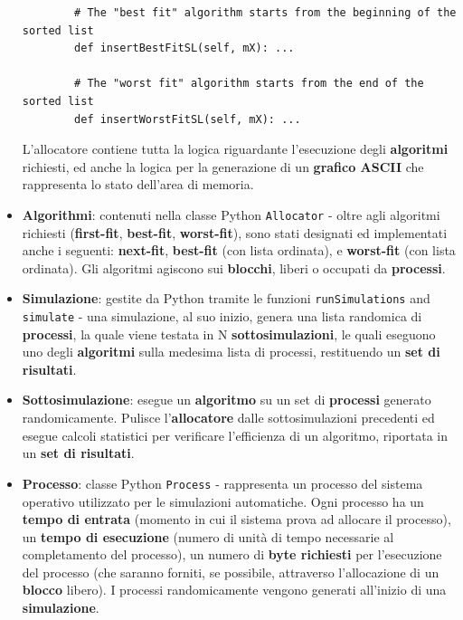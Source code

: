 \documentclass[12pt]{report}
\renewcommand\emph{\textbf}
\begin{document}
\begin{itemize}
\begin{verbatim}
        # The "best fit" algorithm starts from the beginning of the sorted list
        def insertBestFitSL(self, mX): ...

        # The "worst fit" algorithm starts from the end of the sorted list
        def insertWorstFitSL(self, mX): ...
            \end{verbatim}


            L'allocatore contiene tutta la logica riguardante l'esecuzione degli \emph{algoritmi} richiesti, ed anche la logica per la generazione di un \emph{grafico ASCII} che rappresenta lo stato dell'area di memoria.
            \item \emph{Algorithmi}: contenuti nella classe Python \texttt{Allocator} - oltre agli algoritmi richiesti (\emph{first-fit}, \emph{best-fit}, \emph{worst-fit}), sono stati designati ed implementati anche i seguenti: \emph{next-fit}, \emph{best-fit} (con lista ordinata), e \emph{worst-fit} (con lista ordinata).
            Gli algoritmi agiscono sui \emph{blocchi}, liberi o occupati da \emph{processi}.


            \item \emph{Simulazione}: gestite da Python tramite le funzioni \texttt{runSimulations} and \texttt{simulate} - una simulazione, al suo inizio, genera una lista randomica di \emph{processi}, la quale viene testata in N \emph{sottosimulazioni}, le quali eseguono uno degli \emph{algoritmi} sulla medesima lista di processi, restituendo un \emph{set di risultati}.



            \item \emph{Sottosimulazione}: esegue un \emph{algoritmo} su un set di \emph{processi} generato randomicamente. Pulisce l'\emph{allocatore} dalle sottosimulazioni precedenti ed esegue calcoli statistici per verificare l'efficienza di un algoritmo, riportata in un \emph{set di risultati}.
            \item \emph{Processo}: classe Python \texttt{Process} - rappresenta un processo del sistema operativo utilizzato per le simulazioni automatiche. Ogni processo ha un \emph{tempo di entrata} (momento in cui il sistema prova ad allocare il processo), un \emph{tempo di esecuzione} (numero di unità di tempo necessarie al completamento del processo), un numero di \emph{byte richiesti} per l'esecuzione del processo (che saranno forniti, se possibile, attraverso l'allocazione di un \emph{blocco} libero). I processi randomicamente vengono generati all'inizio di una \emph{simulazione}.


\end{itemize}
\end{document}
